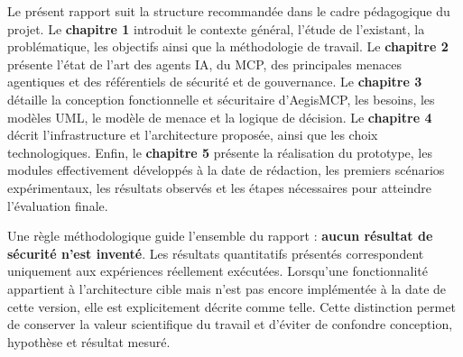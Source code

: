 Le présent rapport suit la structure recommandée dans le cadre pédagogique du projet. Le \textbf{chapitre 1} introduit le contexte général, l'étude de l'existant, la problématique, les objectifs ainsi que la méthodologie de travail. Le \textbf{chapitre 2} présente l'état de l'art des agents IA, du MCP, des principales menaces agentiques et des référentiels de sécurité et de gouvernance. Le \textbf{chapitre 3} détaille la conception fonctionnelle et sécuritaire d'AegisMCP, les besoins, les modèles UML, le modèle de menace et la logique de décision. Le \textbf{chapitre 4} décrit l'infrastructure et l'architecture proposée, ainsi que les choix technologiques. Enfin, le \textbf{chapitre 5} présente la réalisation du prototype, les modules effectivement développés à la date de rédaction, les premiers scénarios expérimentaux, les résultats observés et les étapes nécessaires pour atteindre l'évaluation finale.

Une règle méthodologique guide l'ensemble du rapport : \textbf{aucun résultat de sécurité n'est inventé}. Les résultats quantitatifs présentés correspondent uniquement aux expériences réellement exécutées. Lorsqu'une fonctionnalité appartient à l'architecture cible mais n'est pas encore implémentée à la date de cette version, elle est explicitement décrite comme telle. Cette distinction permet de conserver la valeur scientifique du travail et d'éviter de confondre conception, hypothèse et résultat mesuré.
